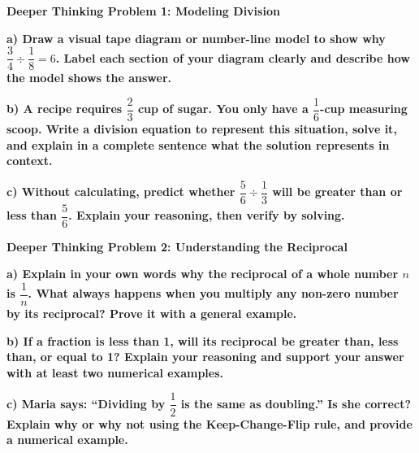 \documentclass[12pt, letterpaper, fleql]{article}
\begin{document}
\newpage

\begin{tcolorbox}[colback=black!5, colframe=black!50, boxrule=1pt, arc=4mm, left=6mm, right=6mm, top=5mm, bottom=5mm]
\textbf{Deeper Thinking Problem 1: Modeling Division}

\medskip

\noindent
\textbf{a) Draw a visual tape diagram or number-line model to show why $\dfrac{3}{4} \div \dfrac{1}{8} = 6$. Label each section of your diagram clearly and describe how the model shows the answer.}

\vspace{4.5cm}

\noindent
\textbf{b) A recipe requires $\dfrac{2}{3}$ cup of sugar. You only have a $\dfrac{1}{6}$-cup measuring scoop. Write a division equation to represent this situation, solve it, and explain in a complete sentence what the solution represents in context.}

\vspace{3cm}

\noindent
\textbf{c) Without calculating, predict whether $\dfrac{5}{6} \div \dfrac{1}{3}$ will be greater than or less than $\dfrac{5}{6}$. Explain your reasoning, then verify by solving.}

\vspace{3cm}
\end{tcolorbox}

\newpage

\begin{tcolorbox}[colback=black!5, colframe=black!50, boxrule=1pt, arc=4mm, left=6mm, right=6mm, top=5mm, bottom=5mm]
\textbf{Deeper Thinking Problem 2: Understanding the Reciprocal}

\medskip

\noindent
\textbf{a) Explain in your own words why the reciprocal of a whole number $n$ is $\dfrac{1}{n}$. What always happens when you multiply any non-zero number by its reciprocal? Prove it with a general example.}

\vspace{3.5cm}

\noindent
\textbf{b) If a fraction is less than 1, will its reciprocal be greater than, less than, or equal to 1? Explain your reasoning and support your answer with at least two numerical examples.}

\vspace{3.5cm}

\noindent
\textbf{c) Maria says: ``Dividing by $\dfrac{1}{2}$ is the same as doubling.'' Is she correct? Explain why or why not using the Keep-Change-Flip rule, and provide a numerical example.}

\vspace{3cm}
\end{tcolorbox}
\end{document}
